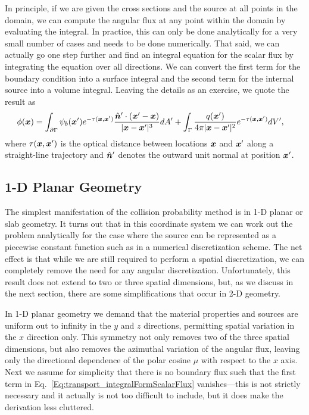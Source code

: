 In principle, if we are given the cross sections and the source at all points in the domain, we can compute the angular flux at any point within the domain by evaluating the integral. In practice, this can only be done analytically for a very small number of cases and needs to be done numerically. That said, we can actually go one step further and find an integral equation for the scalar flux by integrating the equation over all directions. We can convert the first term for the boundary condition into a surface integral and the second term for the internal source into a volume integral. Leaving the details as an exercise, we quote the result as
\begin{align}
  \phi(\bm{x}) 
  &= \int_{\partial\Gamma} \psi_b(\bm{x}') e^{-\tau(\bm{x},\bm{x}')} \frac{ \hat{\bm{n}}' \cdot ( \bm{x}' - \bm{x} ) }{ | \bm{x} - \bm{x}' |^3 } dA' + \int_\Gamma \frac{q( \bm{x}' ) }{4\pi | \bm{x} - \bm{x}' |^2 } e^{-\tau(\bm{x},\bm{x}')} dV', \label{Eq:transport_integralFormScalarFlux}
\end{align}
where $\tau(\bm{x},\bm{x}')$ is the optical distance between locations $\bm{x}$ and $\bm{x}'$ along a straight-line trajectory and $\hat{\bm{n}}'$ denotes the outward unit normal at position $\bm{x}'$.




\subsection{1-D Planar Geometry}

The simplest manifestation of the collision probability method is in 1-D planar or slab geometry. It turns out that in this coordinate system we can work out the problem analytically for the case where the source can be represented as a piecewise constant function such as in a numerical discretization scheme. The net effect is that while we are still required to perform a spatial discretization, we can completely remove the need for any angular discretization. Unfortunately, this result does not extend to two or three spatial dimensions, but, as we discuss in the next section, there are some simplifications that occur in 2-D geometry.

In 1-D planar geometry we demand that the material properties and sources are uniform out to infinity in the $y$ and $z$ directions, permitting spatial variation in the $x$ direction only. This symmetry not only removes two of the three spatial dimensions, but also removes the azimuthal variation of the angular flux, leaving only the directional dependence of the polar cosine $\mu$ with respect to the $x$ axis. Next we assume for simplicity that there is no boundary flux such that the first term in Eq.~\eqref{Eq:transport_integralFormScalarFlux} vanishes---this is not strictly necessary and it actually is not too difficult to include, but it does make the derivation less cluttered.

